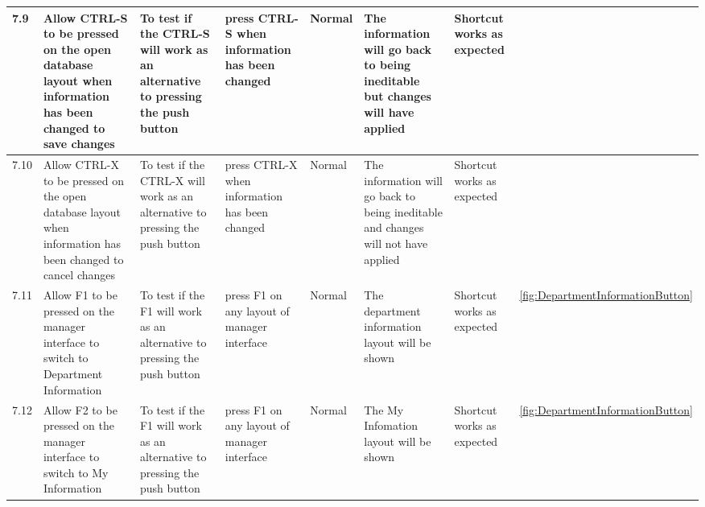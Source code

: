 \begin{landscape}
\begin{center}
\begin{longtable}{|p{1.5cm}|p{2cm}|p{2.5cm}|p{2cm}|p{2cm}|p{2cm}|p{3cm}|p{1.7cm}|}
\rowcolor{lightgray}7.9 & Allow CTRL-S to be pressed on the open database layout when information has been changed to save changes& To test if the CTRL-S will work as an alternative to pressing the push button & press CTRL-S when information has been changed & Normal & The information will go back to being ineditable but changes will have applied  &Shortcut works as expected& \\ \hline
\rowcolor{lightgray}7.10 & Allow CTRL-X to be pressed on the open database layout when information has been changed to cancel changes & To test if the CTRL-X will work as an alternative to pressing the push button & press CTRL-X when information has been changed & Normal & The information will go back to being ineditable and changes will not have applied  &Shortcut works as expected& \\ \hline
\rowcolor{lightgray}7.11& Allow F1 to be pressed on the manager interface to switch to Department Information  & To test if the F1 will work as an alternative to pressing the push button & press F1 on any layout of manager interface & Normal & The department information layout will be shown  &Shortcut works as expected& \ref {fig:DepartmentInformationButton}\\ \hline
\rowcolor{lightgray}7.12 & Allow F2 to be pressed on the manager interface to switch to My Information  & To test if the F1 will work as an alternative to pressing the push button & press F1 on any layout of manager interface & Normal & The My Infomation layout will be shown  &Shortcut works as expected& \ref {fig:DepartmentInformationButton} \\ \hline




\end{longtable}
\end{center}
\end{landscape}
